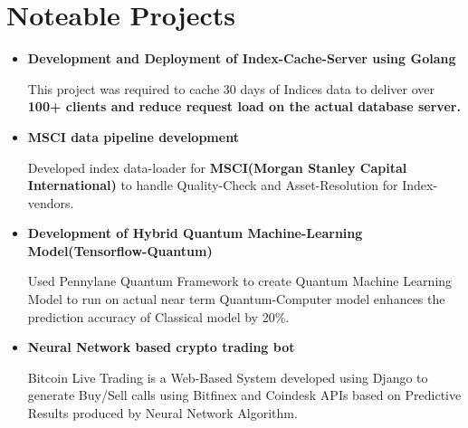 \documentclass[11pt,a4paper,sans]{moderncv}        %
\begin{document}
{\begin{itemize}
\end{itemize}


\section{Noteable Projects}

\vspace{5pt}

\begin{itemize}

\item{\textbf{Development and Deployment of Index-Cache-Server using Golang} \textit{}

\vspace{3pt}

\small{This project was required to cache 30 days of Indices data to deliver over \textbf{100+ clients and reduce request load on the actual database server.}}}

\item{\textbf{MSCI data pipeline development} \textit{}

\vspace{3pt}

\small{Developed index data-loader for \textbf{MSCI(Morgan Stanley Capital International)} to handle Quality-Check and Asset-Resolution for Index-vendors.}}

\vspace{6pt}

\item{\textbf{Development of Hybrid Quantum Machine-Learning Model(Tensorflow-Quantum)} \textit{}

\vspace{3pt}

\small{Used Pennylane Quantum Framework to create Quantum Machine Learning Model to run on actual near term Quantum-Computer model enhances the prediction accuracy of Classical model by 20\%.}}

\vspace{6pt}
\item{\textbf{Neural Network based crypto trading bot}

\vspace{3pt}

\small{Bitcoin Live Trading is a Web-Based System developed using Django to generate Buy/Sell
calls using Bitfinex and Coindesk APIs based on Predictive Results produced by Neural Network Algorithm.}}

\vspace{6pt}


\end{itemize}}
\end{document}
